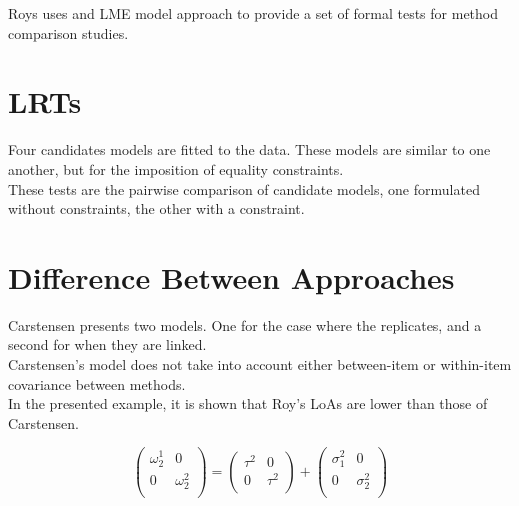 \documentclass[12pt, a4paper]{report}
\theoremstyle{plain}
\theoremstyle{definition}
\theoremstyle{remark}
\begin{document}




Roys uses and LME model approach to provide a set of formal tests for method comparison studies.\\

\section{LRTs}
Four candidates models are fitted to the data. These models are similar to one another, but for the imposition of equality constraints.\\
These tests are the pairwise comparison of candidate models, one formulated without constraints, the other with a constraint.\\

%
%
%
\section{Difference Between Approaches}
Carstensen presents two models. One for the case where the replicates, and a second for when they are linked.\\
Carstensen's model does not take into account either between-item or within-item covariance between methods.\\
In the presented example, it is shown that Roy's LoAs are lower than those of Carstensen.


\[\left(\begin{array}{cc}
\omega^1_2  & 0 \\
0 & \omega^2_2 \\
\end{array}  \right)
=  \left(
\begin{array}{cc}
\tau^2  & 0 \\
0 & \tau^2 \\
\end{array} \right)+
\left(
\begin{array}{cc}
\sigma^2_1  & 0 \\
0 & \sigma^2_2 \\
\end{array}\right)
\]
\end{document}
